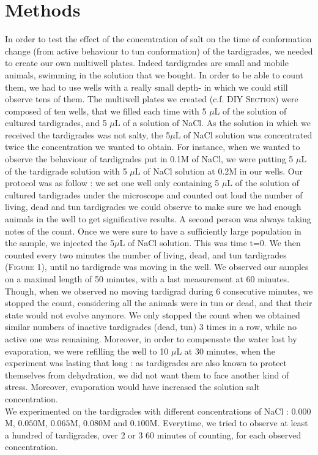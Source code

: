 \documentclass[12pt,a4paper, twocolumn]{article}
\begin{document}
\section{Methods}
In order to test the effect of the concentration of salt on the time of conformation change (from active behaviour to tun conformation) of  the tardigrades, we needed to create our own multiwell plates. Indeed tardigrades are small and mobile animals, swimming in the solution that we bought. In order to be able to count them, we had to use wells with a really small depth- in which we could still observe tens of them. The multiwell plates we created (c.f. DIY \textsc{Section}) were composed of ten wells, that we filled each time with 5 $\mu$L of the solution of cultured tardigrades, and 5 $\mu$L of a solution of NaCl. As the solution in which we received the tardigrades was not salty, the 5$\mu$L of NaCl solution was concentrated twice the concentration we wanted to obtain. For instance, when we wanted to observe the behaviour of tardigrades put in 0.1M of NaCl, we were putting  5 $\mu$L of the tardigrade solution with 5 $\mu$L of NaCl solution at 0.2M in our wells.
Our protocol was as follow : we set one well only containing 5 $\mu$L of the solution of cultured tardigrades under the microscope and counted out loud the number of living, dead and tun tardigrades we could observe to make sure we had enough animals in the well to get significative results. A second person was always taking notes of the count. Once we were sure to have a sufficiently large population in the sample, we injected the 5$\mu$L of NaCl solution. This was time t=0. We then counted every two minutes the number of living, dead, and tun tardigrades (\textsc{Figure} 1), until no tardigrade was moving in the well. We observed our samples on a maximal length of 50 minutes, with a last measurement at 60 minutes. Though, when we observed no moving tardigrad during 6 consecutive minutes, we stopped the count, considering all the animals were in tun or dead, and that their state would not evolve anymore. We only stopped the count when we obtained similar numbers of inactive tardigrades (dead, tun) 3 times in a row, while no active one was remaining.
Moreover, in order to compensate the water lost by evaporation, we were refilling the well to 10 $\mu$L at 30 minutes, when the experiment was lasting that long : as tardigrades are also known to protect themselves from dehydration, we did not want them to face another kind of stress. Moreover, evaporation would have increased the solution salt concentration.\\
We experimented on the tardigrades with different concentrations of NaCl : $0.000$M, $0.050$M, $0.065$M, $0.080$M and $0.100$M. Everytime, we tried to observe at least a hundred of tardigrades, over 2 or 3 60 minutes of counting, for each observed concentration. \\
\end{document}

